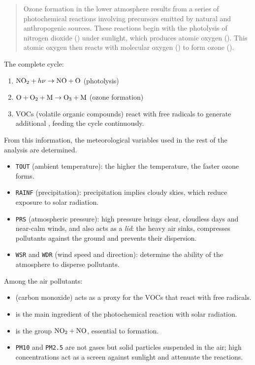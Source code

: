 \begin{quote}
    Ozone formation in the lower atmosphere results from a series of
    photochemical reactions involving precursors emitted by natural and
    anthropogenic sources. These reactions begin with the photolysis of
    nitrogen dioxide () under sunlight, which produces atomic oxygen
    (). This atomic oxygen then reacts with molecular oxygen ()
    to form ozone ().
\end{quote}

The complete cycle:

\begin{enumerate}
    \item $\ce{NO2} + h\nu \to \ce{NO}+\ce{O}$ (photolysis)
    \item $\ce{O} + \ce{O2} + \ce{M} \to \ce{O3} + \ce{M}$ (ozone formation)
    \item VOCs (volatile organic compounds) react with free radicals to
      generate additional , feeding the cycle continuously.
\end{enumerate}

From this information, the meteorological variables used in the rest of the
analysis are determined.

\begin{itemize}
    \item \texttt{TOUT} (ambient temperature): the higher the temperature,
      the faster ozone forms.
    \item \texttt{RAINF} (precipitation): precipitation implies cloudy skies,
      which reduce exposure to solar radiation.
    \item \texttt{PRS} (atmospheric pressure): high pressure brings clear,
      cloudless days and near-calm winds, and also acts as a \textit{lid}:
      the heavy air sinks, compresses pollutants against the ground and
      prevents their dispersion.
    \item \texttt{WSR} and \texttt{WDR} (wind speed and direction):
      determine the ability of the atmosphere to disperse pollutants.
\end{itemize}

Among the air pollutants:

\begin{itemize}
    \item {} (carbon monoxide) acts as a proxy for the VOCs that react
      with free radicals.
    \item {} is the main ingredient of the photochemical reaction with
      solar radiation.
    \item {} is the group $\ce{NO2} + \ce{NO}$, essential to 
      formation.
    \item \texttt{PM10} and \texttt{PM2.5} are not gases but solid particles
      suspended in the air; high concentrations act as a screen against
      sunlight and attenuate the reactions.
\end{itemize}

